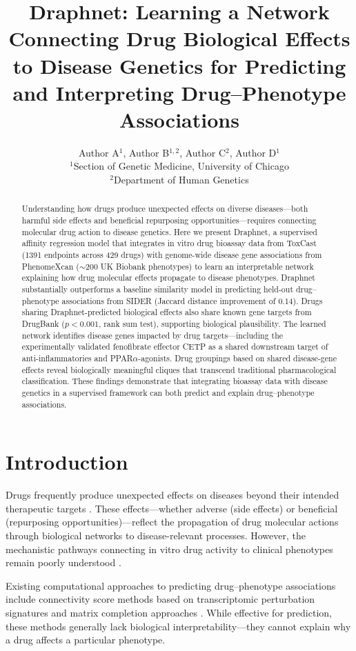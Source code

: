 \documentclass[11pt]{article}
\title{Draphnet: Learning a Network Connecting Drug Biological Effects to Disease Genetics for Predicting and Interpreting Drug--Phenotype Associations}
\author{Author A$^{1}$, Author B$^{1,2}$, Author C$^{2}$, Author D$^{1}$\\[6pt]
$^{1}$Section of Genetic Medicine, University of Chicago\\
$^{2}$Department of Human Genetics}
\date{}
\begin{document}
\maketitle

\begin{abstract}
Understanding how drugs produce unexpected effects on diverse diseases---both harmful side effects and beneficial repurposing opportunities---requires connecting molecular drug action to disease genetics. Here we present Draphnet, a supervised affinity regression model that integrates in vitro drug bioassay data from ToxCast (1391 endpoints across 429 drugs) with genome-wide disease gene associations from PhenomeXcan (${\sim}$200 UK Biobank phenotypes) to learn an interpretable network explaining how drug molecular effects propagate to disease phenotypes. Draphnet substantially outperforms a baseline similarity model in predicting held-out drug--phenotype associations from SIDER (Jaccard distance improvement of 0.14). Drugs sharing Draphnet-predicted biological effects also share known gene targets from DrugBank ($p < 0.001$, rank sum test), supporting biological plausibility. The learned network identifies disease genes impacted by drug targets---including the experimentally validated fenofibrate effector CETP as a shared downstream target of anti-inflammatories and PPAR$\alpha$-agonists. Drug groupings based on shared disease-gene effects reveal biologically meaningful cliques that transcend traditional pharmacological classification. These findings demonstrate that integrating bioassay data with disease genetics in a supervised framework can both predict and explain drug--phenotype associations.
\end{abstract}

\section{Introduction}

Drugs frequently produce unexpected effects on diseases beyond their intended therapeutic targets \citep{ashburn2004drug, pushpakom2019drug}. These effects---whether adverse (side effects) or beneficial (repurposing opportunities)---reflect the propagation of drug molecular actions through biological networks to disease-relevant processes. However, the mechanistic pathways connecting in vitro drug activity to clinical phenotypes remain poorly understood \citep{keiser2009predicting, oprea2018unexplored}.

Existing computational approaches to predicting drug--phenotype associations include connectivity score methods based on transcriptomic perturbation signatures \citep{lamb2006connectivity, subramanian2017next} and matrix completion approaches \citep{natarajan2014inductive, lotfi2018bayesian}. While effective for prediction, these methods generally lack biological interpretability---they cannot explain why a drug affects a particular phenotype.
\end{document}
